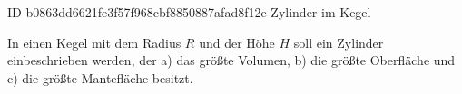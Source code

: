 \begin{exercise}
      {ID-b0863dd6621fe3f57f968cbf8850887afad8f12e}
      {Zylinder im Kegel}
  \ifproblem\problem\par
    In einen Kegel mit dem Radius $R$ und der Höhe $H$ soll ein Zylinder
    einbeschrieben werden, der
    \quad a) das größte Volumen,
    \quad b) die größte Oberfläche und
    \quad c) die größte Mantefläche
    besitzt.
  \fi
\end{exercise}
